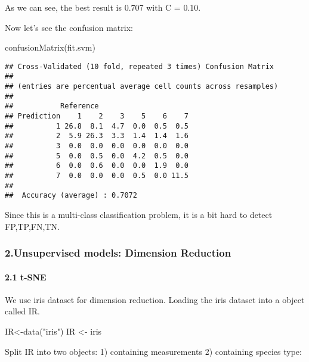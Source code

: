 \documentclass[
]{article}
\newenvironment{Shaded}{\begin{snugshade}}{\end{snugshade}}
\newcommand{\FunctionTok}[1]{\textcolor[rgb]{0.00,0.00,0.00}{#1}}
\newcommand{\NormalTok}[1]{#1}
\newcommand{\OtherTok}[1]{\textcolor[rgb]{0.56,0.35,0.01}{#1}}
\newcommand{\StringTok}[1]{\textcolor[rgb]{0.31,0.60,0.02}{#1}}
\begin{document}
As we can see, the best result is 0.707 with C = 0.10.

Now let's see the confusion matrix:

\begin{Shaded}
\begin{Highlighting}[]
\FunctionTok{confusionMatrix}\NormalTok{(fit.svm)}
\end{Highlighting}
\end{Shaded}

\begin{verbatim}
## Cross-Validated (10 fold, repeated 3 times) Confusion Matrix 
## 
## (entries are percentual average cell counts across resamples)
##  
##           Reference
## Prediction    1    2    3    5    6    7
##          1 26.8  8.1  4.7  0.0  0.5  0.5
##          2  5.9 26.3  3.3  1.4  1.4  1.6
##          3  0.0  0.0  0.0  0.0  0.0  0.0
##          5  0.0  0.5  0.0  4.2  0.5  0.0
##          6  0.0  0.6  0.0  0.0  1.9  0.0
##          7  0.0  0.0  0.0  0.5  0.0 11.5
##                             
##  Accuracy (average) : 0.7072
\end{verbatim}

Since this is a multi-class classification problem, it is a bit hard to
detect FP,TP,FN,TN.

\hypertarget{unsupervised-models-dimension-reduction}{%
\subsubsection{2.Unsupervised models: Dimension
Reduction}\label{unsupervised-models-dimension-reduction}}

\hypertarget{t-sne}{%
\paragraph{2.1 t-SNE}\label{t-sne}}

We use iris dataset for dimension reduction. Loading the iris dataset
into a object called IR.

\begin{Shaded}
\begin{Highlighting}[]
\NormalTok{IR}\OtherTok{\textless{}{-}}\FunctionTok{data}\NormalTok{(}\StringTok{"iris"}\NormalTok{)}
\NormalTok{IR }\OtherTok{\textless{}{-}}\NormalTok{ iris}
\end{Highlighting}
\end{Shaded}

Split IR into two objects: 1) containing measurements 2) containing
species type:
\end{document}
